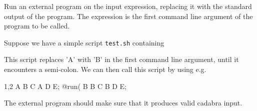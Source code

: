 
Run an external program on the input expression, replacing it with the
standard output of the program. The expression is the first command
line argument of the program to be called.

Suppose we have a simple script {\tt test.sh} containing
This script replaces 'A' with 'B' in the first command line argument,
until it encounters a semi-colon.  We can then call this script by
using e.g.
\begin{screen}{1,2}
A B C A D E;
@run(%
B B C B D E;
\end{screen}
The external program should make sure that it produces valid cadabra
input. 
